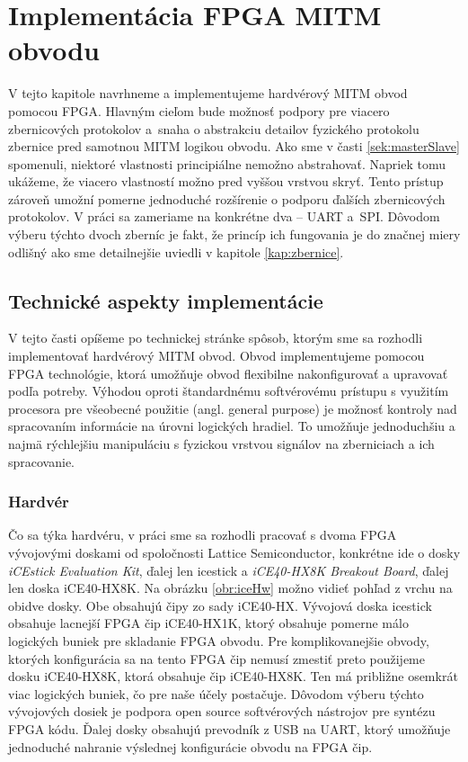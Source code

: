 \chapter{Implementácia FPGA MITM obvodu}
\label{kap:implementacia}

V tejto kapitole navrhneme a implementujeme hardvérový MITM obvod pomocou FPGA. Hlavným cieľom bude možnosť podpory pre viacero zbernicových protokolov a~snaha o abstrakciu detailov fyzického protokolu zbernice pred samotnou MITM logikou obvodu. Ako sme v časti \ref{sek:masterSlave} spomenuli, niektoré vlastnosti principiálne nemožno abstrahovať. Napriek tomu ukážeme, že viacero vlastností možno pred vyššou vrstvou skryť. Tento prístup zároveň umožní pomerne jednoduché rozšírenie o podporu ďalších zbernicových protokolov. V práci sa zameriame na konkrétne dva -- UART a~SPI. Dôvodom výberu týchto dvoch zberníc je fakt, že princíp ich fungovania je do značnej miery odlišný ako sme detailnejšie uviedli v kapitole \ref{kap:zbernice}.

\section{Technické aspekty implementácie}
V tejto časti opíšeme po technickej stránke spôsob, ktorým sme sa rozhodli implementovať hardvérový MITM obvod. Obvod implementujeme pomocou FPGA technológie, ktorá umožňuje obvod flexibilne nakonfigurovať a upravovať podľa potreby. Výhodou oproti štandardnému softvérovému prístupu s využitím procesora pre všeobecné použitie (angl. general purpose) je možnosť kontroly nad spracovaním informácie na úrovni logických hradiel. To umožňuje jednoduchšiu a najmä rýchlejšiu manipuláciu s fyzickou vrstvou signálov na zberniciach a ich spracovanie.

\subsection{Hardvér}
Čo sa týka hardvéru, v práci sme sa rozhodli pracovať s dvoma FPGA vývojovými doskami od spoločnosti Lattice Semiconductor, konkrétne ide o dosky \textit{iCEstick Evaluation Kit}, ďalej len icestick a \textit{iCE40-HX8K Breakout Board}, ďalej len doska iCE40-HX8K. Na obrázku \ref{obr:iceHw} možno vidieť pohľad z vrchu na obidve dosky. Obe obsahujú čipy zo sady iCE40-HX. Vývojová doska icestick obsahuje lacnejší FPGA čip iCE40-HX1K, ktorý obsahuje pomerne málo logických buniek pre skladanie FPGA obvodu. Pre komplikovanejšie obvody, ktorých konfigurácia sa na tento FPGA čip nemusí zmestiť preto použijeme dosku iCE40-HX8K, ktorá obsahuje čip iCE40-HX8K. Ten má približne osemkrát viac logických buniek, čo pre naše účely postačuje. Dôvodom výberu týchto vývojových dosiek je podpora open source softvérových nástrojov pre syntézu FPGA kódu. Ďalej dosky obsahujú prevodník z USB na UART, ktorý umožňuje jednoduché nahranie výslednej konfigurácie obvodu na FPGA čip.

